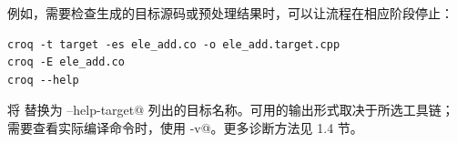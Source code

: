 例如，需要检查生成的目标源码或预处理结果时，可以让流程在相应阶段停止：

\begin{lstlisting}[language=croqtile,caption={查看中间输出与编译器帮助}]
croq -t target -es ele_add.co -o ele_add.target.cpp
croq -E ele_add.co
croq --help
\end{lstlisting}

将 \co@target@ 替换为 \co@croq --help-target@ 列出的目标名称。可用的输出形式取决于所选工具链；需要查看实际编译命令时，使用 \co@-v@。更多诊断方法见 1.4 节。
